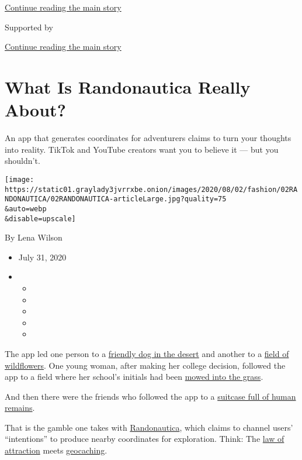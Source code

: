 \protect\hyperlink{after-top}{Continue reading the main story}

Supported by

\protect\hyperlink{after-sponsor}{Continue reading the main story}

\hypertarget{what-is-randonautica-really-about}{%
\section{What Is Randonautica Really
About?}\label{what-is-randonautica-really-about}}

An app that generates coordinates for adventurers claims to turn your
thoughts into reality. TikTok and YouTube creators want you to believe
it --- but you shouldn't.

\texttt{[image: https://static01.graylady3jvrrxbe.onion/images/2020/08/02/fashion/02RANDONAUTICA/02RANDONAUTICA-articleLarge.jpg?quality=75\\\&auto=webp\\\&disable=upscale]}

By Lena Wilson

\begin{itemize}
\item
  July 31, 2020
\item
  \begin{itemize}
  \item
  \item
  \item
  \item
  \item
  \end{itemize}
\end{itemize}

The app led one person to a
\href{https://vm.tiktok.com/JNK12b4/}{friendly dog in the desert} and
another to a
\href{https://www.reddit.com/r/randonauts/comments/hjfwea/first_time_intention_was_pretty_flowers_took_me/}{field
of wildflowers}. One young woman, after making her college decision,
followed the app to a field where her school's initials had been
\href{https://vm.tiktok.com/JNKFyW3/}{mowed into the grass}.

And then there were the friends who followed the app to a
\href{https://vm.tiktok.com/JNKJHA5/}{suitcase full of human remains}.

That is the gamble one takes with
\href{https://www.randonautica.com/}{Randonautica}, which claims to
channel users' ``intentions'' to produce nearby coordinates for
exploration. Think: The
\href{https://www.nytimes3xbfgragh.onion/2010/09/26/books/review/Chabris-t.html?searchResultPosition=5}{law
of attraction} meets
\href{https://www.nytimes3xbfgragh.onion/2018/08/29/nyregion/new-york-city-geocachers-paradise.html?searchResultPosition=3}{geocaching}.

